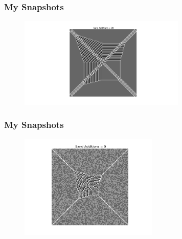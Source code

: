 \documentclass{beamer}
\begin{document}
\frame
{
  \frametitle{My Snapshots}
    
   \begin{figure}
   \includegraphics[width = 300]{centerhomo}
   \end{figure}
}

\frame
{
  \frametitle{My Snapshots}
    
   \begin{figure}
   \includegraphics[width = 250]{center23}
   \end{figure}
}
\end{document}
